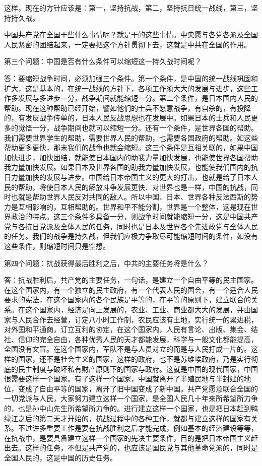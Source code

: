 这样，现在的方针应该是：第一，坚持抗战，第二，坚持抗日统一战线，第三，坚持持久战。

中国共产党在全国干些什么事情呢？就是干的这些事情。中央愿与各党各派及全国人民紧密的团结起来，一定要把这个方针贯彻下去，这就是中共在全国的作用。

第三个问题：中国是否有什么条件可以缩短这一持久战时间呢？

答：要缩短战争时间，必须加强三个条件。第一个条件，是中国的统一战线巩固和扩大，这是基本的，在统一战线的方针下，各项工作须大大的发展与进步，这些工作多发展与多进步一分，战争期间就能缩短一分。第二个条件，是日本国内人民的帮助。现在这种帮助已经开始，譬如他们的士兵不愿意战争，有自杀的，有投降的，有发反战争传单的，日本人民反战思想也在发展中。如果日本的士兵和人民更多的觉悟一分，战争期间也就可以缩短一分。还有一个条件，是世界各国的帮助。我们需要世界学生的帮助，需要世界人民的帮助，也需要各国政府的帮助。如这些帮助更多更快，那末我们的战争也就会缩短。这三个条件是互相关联的，如果中国加快进步，加快团结，就能使日本国内的助我力量加快发展，也能使世界各国帮助我力量加快发展。如果日本及世界各国的助我力量加快发展，也能使我们国内的抗日力量加快的发展与进步。中国给日本帝国主义的更大的打击，也就是给了日本人民的帮助，将使日本人民的解放斗争发展更快．对世界也是一样，中国的抗战，同时也就是帮助世界人民反对共同的敌人。所以中国、日本、世界各种反法西斯的势力是互相影响的，互相帮助的。世界和平不能分割，世界是一个整体，这是现在世界政治的特点。这三个条件多具备一分，则战争时间就能缩短一分，这是中国共产党与各抗日党派及全体人民的任务，同时也是日本及世界各个先进政党与全体人民的任务。我们的战争是持久战，但我们应极力争取尽可能缩短时间的条件，如没有这些条件，则缩短时间只是空想。

第四个问题：抗战获得最后胜利之后，中共的主要任务将是什么？

答：抗战胜利后，共产党的主要任务，一句话，是建立一个自由平等的民主国家。在这个国家内，有一个独立的民主政府，有一个代表人民的国会，有一个适合人民要求的宪法，在这个国家内的各个民族是平等的，在平等的原则下，建立联合的关系。在这个国家内，经济是向上发展的，农业、工业、商业都大大的发展，并由国家与人民合作去经营，订定八小时工作制，农民应该有土地，实行统一的累进税，对外国和平通商，订立互利的协定，在这个国家内，人民有言论、出版、集会、结社、信仰的完全自由，各种优秀人民的天才都能发展，科学与一般文化都能提高，全国没有文盲。在这个国家内，军队不是与人员对立的而是与人民打成一片的。这样的国家，还不是社会主义的国家，这样的政府，也不是苏维埃政府，乃是实行彻底的民主制度与破坏私有财产原则下的国家与政府。这就是中国的现代国家，中国很需要这样一个国家。有了这样一个国家，中国就离开了半殖民地与半封建的地位，变成了自由平等的国家，离开了旧中国变成了新中国。共产党愿意联合全国的一切党派与人民，大家努力建立这样一个国家，是全国人民几十年来所希望所力争的，也是孙中山先生所希望所力争的。进行建立这样一个国家，也是把日本赶到鸭绿江之后的第二天才开始的，抗战过程中的各种工作，就都与建立这样的国家有关系。不过许多重要工作是要在抗战胜利之后才能完成，例如基本的经济建设等等，在抗战中，是要具备建立这样一个国家的先决主要条件，目的是把日本帝国主义赶出去。这样的任务，不但是共产党的，也应该是国民党与其他革命党派的，同时是全国人民的，这是中国的历史任务。

